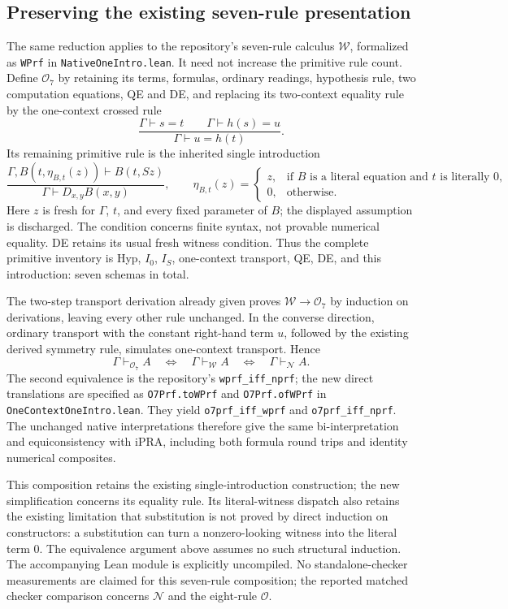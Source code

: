 \documentclass[11pt,letterpaper]{article}
\theoremstyle{definition}\newtheorem{definition}[theorem]{Definition}
\theoremstyle{remark}\newtheorem{remark}[theorem]{Remark}
\begin{document}
\subsection{Preserving the existing seven-rule presentation}

The same reduction applies to the repository's seven-rule calculus
$\mathcal W$, formalized as \texttt{WPrf} in
\texttt{NativeOneIntro.lean}. It need not increase the primitive rule
count. Define $\mathcal O_7$ by retaining its terms, formulas, ordinary
readings, hypothesis rule, two computation equations, QE and DE, and
replacing its two-context equality rule by the one-context crossed rule
\[
 \frac{\Gamma\vdash s=t\qquad\Gamma\vdash h(s)=u}
      {\Gamma\vdash u=h(t)}.
\]
Its remaining primitive rule is the inherited single introduction
\[
 \frac{\Gamma,B(t,\eta_{B,t}(z))\vdash B(t,Sz)}
      {\Gamma\vdash D_{x,y}B(x,y)},
 \qquad
 \eta_{B,t}(z)=
 \begin{cases}
   z,&\text{if $B$ is a literal equation and $t$ is literally $0$,}\\
   0,&\text{otherwise.}
 \end{cases}
\]
Here $z$ is fresh for $\Gamma$, $t$, and every fixed parameter of $B$;
the displayed assumption is discharged. The condition concerns finite
syntax, not provable numerical equality. DE retains its usual fresh
witness condition. Thus the complete primitive inventory is Hyp,
$I_0$, $I_S$, one-context transport, QE, DE, and this introduction:
seven schemas in total.

The two-step transport derivation already given proves
$\mathcal W\to\mathcal O_7$ by induction on derivations, leaving every
other rule unchanged. In the converse direction, ordinary transport
with the constant right-hand term $u$, followed by the existing derived
symmetry rule, simulates one-context transport. Hence
\[
 \Gamma\vdash_{\mathcal O_7}A
 \quad\Longleftrightarrow\quad
 \Gamma\vdash_{\mathcal W}A
 \quad\Longleftrightarrow\quad
 \Gamma\vdash_{\mathcal N}A.
\]
The second equivalence is the repository's
\texttt{wprf\_iff\_nprf}; the new direct translations are specified as
\texttt{O7Prf.toWPrf} and \texttt{O7Prf.ofWPrf} in
\texttt{OneContextOneIntro.lean}. They yield
\texttt{o7prf\_iff\_wprf} and \texttt{o7prf\_iff\_nprf}.
The unchanged native interpretations therefore give the same
bi-interpretation and equiconsistency with iPRA, including both formula
round trips and identity numerical composites.

This composition retains the existing single-introduction construction;
the new simplification concerns its equality rule. Its literal-witness
dispatch also retains the existing limitation that substitution is not
proved by direct induction on constructors: a substitution can turn a
nonzero-looking witness into the literal term $0$. The equivalence
argument above assumes no such structural induction. The accompanying
Lean module is explicitly uncompiled. No standalone-checker measurements
are claimed for this seven-rule composition; the reported matched
checker comparison concerns $\mathcal N$ and the eight-rule
$\mathcal O$.
\end{document}

